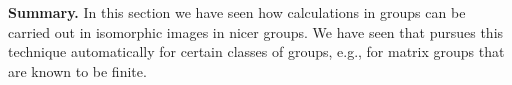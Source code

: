 {\bf Summary.}  In this section we have  seen  how calculations in groups
can be carried  out in isomorphic  images in  nicer groups. We  have seen
that {\GAP}  pursues this technique  automatically for certain classes of
groups, e.g., for matrix groups that are known to be finite.


